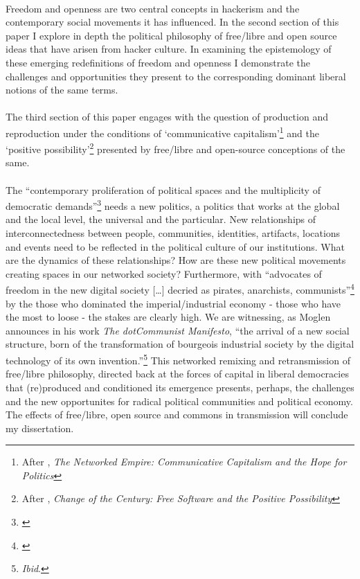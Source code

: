 \documentclass[11pt,titlepage]{book}
\begin{document}
\paragraph{}Freedom and openness are two central concepts in hackerism and the contemporary social movements it has influenced. In the second section of this paper I explore in depth the political philosophy of free/libre and open source ideas that have arisen from hacker culture. In examining the epistemology of these emerging redefinitions of freedom and openness I demonstrate the challenges and opportunities they present to the corresponding dominant liberal notions of the same terms.

\paragraph{}The third section of this paper engages with the question of production and reproduction under the conditions of `communicative capitalism'\footnote{After \cite{dean:2005cc}, \textit{The Networked Empire: Communicative Capitalism and the Hope for Politics}} and the `positive possibility'\footnote{After \cite{Hardie:2005px}, \textit{Change of the Century: Free Software and the Positive Possibility}} presented by free/libre and open-source conceptions of the same. 

\paragraph{}The ``contemporary proliferation of political spaces and the multiplicity of democratic demands''\footnote{\cite[p.17]{Mouffe:2000fk}} needs a new politics, a politics that works at the global and the local level, the universal and the particular. New relationships of interconnectedness between people, communities, identities, artifacts, locations and events need to be reflected in the political culture of our institutions. What are the dynamics of these relationships? How are these new political movements creating spaces in our networked society? Furthermore, with ``advocates of freedom in the new digital society [\ldots] decried as pirates, anarchists, communists''\footnote{\cite{moglen:2003dcm}} by the those who dominated the imperial/industrial economy - those who have the most to loose - the stakes are clearly high. We are witnessing, as Moglen announces in his work \textit{The dotCommunist Manifesto}, ``the arrival of a new social structure, born of the transformation of bourgeois industrial society by the digital technology of its own invention.''\footnote{\textit{Ibid}.} This networked remixing and retransmission of free/libre philosophy, directed back at the forces of capital in liberal democracies that (re)produced and conditioned its emergence presents, perhaps, the challenges and the new opportunites for radical political communities and political economy. The effects of free/libre, open source and commons in transmission will conclude my dissertation.
\newpage
\end{document}
